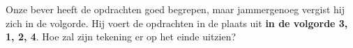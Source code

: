 \documentclass[12pt]{article}
\begin{document}
\begin{minipage}{\textwidth}
			\begin{figure}[H]
				\flushleft
			\end{figure}
			
			Onze bever heeft de opdrachten goed begrepen, maar jammergenoeg vergist hij zich in de volgorde. Hij voert de opdrachten in de plaats uit \textbf{in de volgorde 3, 1, 2, 4}. Hoe zal zijn tekening er op het einde uitzien?
			

\end{minipage}
\end{document}
